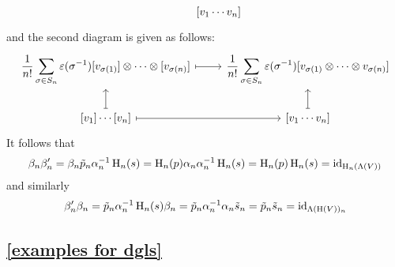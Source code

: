 \documentclass[a4paper,10pt,headings=standardclasses]{scrartcl}
\begin{document}
\begin{enumerate}
\[\begin{tikzcd}
        &
        {[v_1 \dotsm v_n]}
      \end{tikzcd}
    \]
    and the second diagram is given as follows:
    \[
      \begin{tikzcd}
        \displaystyle
        \frac{1}{n!} \sum_{\sigma \in S_n} \varepsilon(\sigma^{-1})
        {[v_{\sigma(1)}]} \tensor \dotsb \tensor {[v_{\sigma(n)}]}
        \arrow[mapsto]{r}
        &
        \displaystyle
        \frac{1}{n!} \sum_{\sigma \in S_n} \varepsilon(\sigma^{-1})
        {[v_{\sigma(1)} \tensor \dotsb \tensor v_{\sigma(n)}]}
        \\
        {[v_1]} \dotsm {[v_n]}
        \arrow[mapsto]{u}
        \arrow[mapsto]{r}
        &
        {[v_1 \dotsm v_n]}
        \arrow[mapsto]{u}
      \end{tikzcd}
    \]
    It follows that
    \[
      \beta_n \beta'_n
      =
      \beta_n \tilde{p}_n \alpha_n^{-1} \operatorname{H}_n(s)
      =
      \operatorname{H}_n(p) \alpha_n \alpha_n^{-1} \operatorname{H}_n(s)
      =
      \operatorname{H}_n(p) \operatorname{H}_n(s)
      =
      \operatorname{id}_{\operatorname{H}_n(\operatorname{\Lambda}(V))}
    \]
    and similarly
    \[
      \beta'_n \beta_n
      =
      \tilde{p}_n \alpha_n^{-1} \operatorname{H}_n(s) \beta_n
      =
      \tilde{p}_n \alpha_n^{-1} \alpha_n \tilde{s}_n
      =
      \tilde{p}_n \tilde{s}_n
      =
      \operatorname{id}_{\operatorname{\Lambda}(\operatorname{H}(V))_n}
    \]
\end{enumerate}








\subsection{\cref{examples for dgls}}
\label{examples for dgls proof}
\end{document}

